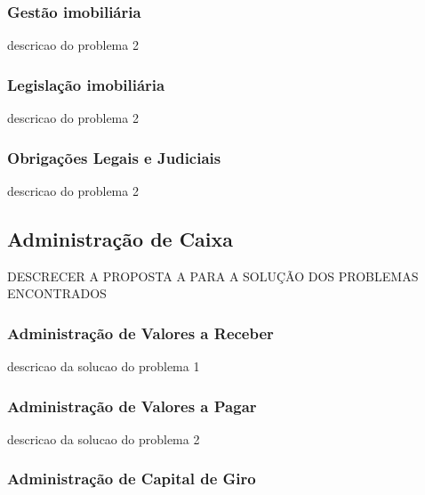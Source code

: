 \documentclass[../main.tex]{subfiles}
\begin{document}
\subsubsection{Gestão imobiliária}
descricao do problema 2
\subsubsection{Legislação imobiliária}
descricao do problema 2
\subsubsection{Obrigações Legais e Judiciais}
descricao do problema 2

\subsection{Administração de Caixa}
DESCRECER A PROPOSTA A PARA A SOLUÇÃO DOS PROBLEMAS ENCONTRADOS
\subsubsection{Administração de Valores a Receber}
descricao da solucao do problema 1
\subsubsection{Administração de Valores a Pagar}
descricao da solucao do problema 2
\subsubsection{Administração de Capital de Giro}

\end{document}
